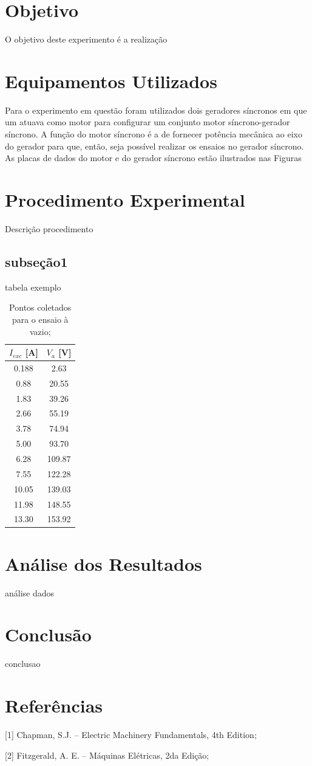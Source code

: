 \documentclass[a4paper, 12pt]{article}
\begin{document}
\section{Objetivo}

O objetivo deste experimento é a realização 
\section{Equipamentos Utilizados}

Para o experimento em questão foram utilizados dois geradores síncronos em que um atuava como motor para configurar um conjunto motor síncrono-gerador síncrono. A função do motor síncrono é a de fornecer potência mecânica ao eixo do gerador para que, então, seja possível realizar os ensaios no gerador síncrono. As placas de dados do motor e do gerador síncrono estão ilustrados nas Figuras 

\section{Procedimento Experimental}

Descrição procedimento

\subsection{subseção1}

tabela exemplo

\begin{table}[htb]
\centering
\begin{tabular}{c|c}
$I_{exc}$ [A] & $V_{a}$ [V] \\ \hline
0.188	& 2.63 		\\\hline
0.88 & 20.55	\\\hline
1.83 & 39.26 \\\hline
2.66 & 55.19 \\\hline
3.78 & 74.94 \\\hline
5.00 & 93.70 \\\hline
6.28 & 109.87 \\\hline
7.55 & 122.28 \\\hline
10.05 & 139.03 \\\hline
11.98 & 148.55 \\\hline
13.30 & 153.92 
\end{tabular}
\caption{Pontos coletados para o ensaio à vazio;}
\label{vazio}
\end{table}



\section{Análise dos Resultados}


análise dados
\section{Conclusão}

conclusao



\newpage
\section{Referências}

[1] Chapman, S.J. -- Electric Machinery Fundamentals, 4th Edition;

[2] Fitzgerald, A. E. -- Máquinas Elétricas, 2da Edição;
\end{document}
